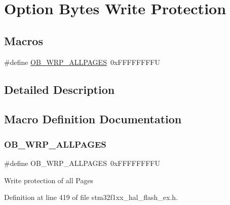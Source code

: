 \hypertarget{group___f_l_a_s_h_ex___o_b___write___protection}{}\section{Option Bytes Write Protection}
\label{group___f_l_a_s_h_ex___o_b___write___protection}
\subsection*{Macros}
\begin{DoxyCompactItemize}
\item 
\#define \hyperlink{group___f_l_a_s_h_ex___o_b___write___protection_ga0cc7fc37c49d200418353f977e35139c}{O\+B\+\_\+\+W\+R\+P\+\_\+\+A\+L\+L\+P\+A\+G\+ES}~0x\+F\+F\+F\+F\+F\+F\+F\+FU
\end{DoxyCompactItemize}


\subsection{Detailed Description}


\subsection{Macro Definition Documentation}
\mbox{\label{group___f_l_a_s_h_ex___o_b___write___protection_ga0cc7fc37c49d200418353f977e35139c}} 
\subsubsection{\texorpdfstring{O\+B\+\_\+\+W\+R\+P\+\_\+\+A\+L\+L\+P\+A\+G\+ES}{OB\_WRP\_ALLPAGES}}
{\footnotesize\ttfamily \#define O\+B\+\_\+\+W\+R\+P\+\_\+\+A\+L\+L\+P\+A\+G\+ES~0x\+F\+F\+F\+F\+F\+F\+F\+FU}

Write protection of all Pages 

Definition at line 419 of file stm32f1xx\+\_\+hal\+\_\+flash\+\_\+ex.\+h.

